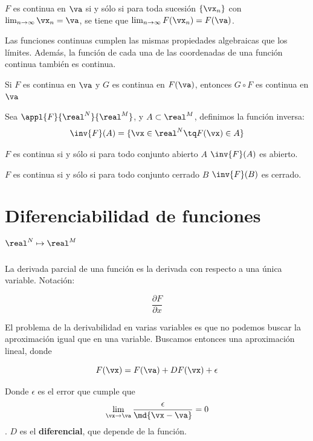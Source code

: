 \documentclass[nochap]{apuntes}
\begin{document}
\begin{theorem}
$F$ es continua en $\va$ si y sólo si para toda sucesión $\{\vx_n\}$ con $\lim_{n\to\infty} \vx_n = \va$, se tiene que $\lim_{n\to\infty} F(\vx_n) = F(\va)$.
\end{theorem}

Las funciones continuas cumplen las mismas propiedades algebraicas que los límites. Además, la función de cada una de las coordenadas de una función continua también es continua.

\begin{theorem}
Si $F$ es continua en $\va$ y $G$ es continua en $F(\va)$, entonces $G\circ F$ es continua en $\va$
\end{theorem}

\begin{defn}
Sea $\appl{F}{\real^N}{\real^M}$, y $A\subset \real^M$, definimos la función inversa: \[\inv{F}(A) = \{ \vx\in\real^N\tq F(\vx) \in A \}\]
\end{defn}

\begin{theorem}
$F$ es continua si y sólo si para todo conjunto abierto $A$ $\inv{F}(A)$ es abierto.
\end{theorem}

\begin{theorem}
$F$ es continua si y sólo si para todo conjunto cerrado $B$ $\inv{F}(B)$ es cerrado.
\end{theorem}

\section{Diferenciabilidad de funciones $\real^N \mapsto \real^M$}

\begin{defn}
La derivada parcial de una función es la derivada con respecto a una única variable. Notación: 

\[ \frac{\partial F}{\partial x} \]
\end{defn}


El problema de la derivabilidad en varias variables es que no podemos buscar la aproximación igual que en una variable. Buscamos entonces una aproximación lineal, donde

\[ F(\vx) = F(\va) +DF(\vx) + \epsilon \]

Donde $\epsilon$ es el error que cumple que \[\lim_{\vx\to\va} \frac{\epsilon}{\md{\vx-\va}} =0\]. $D$ es el \textbf{diferencial}, que depende de la función.
\end{document}

